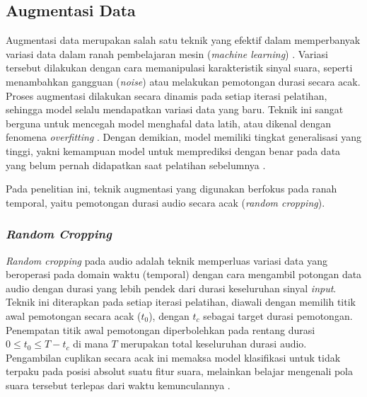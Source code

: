 \subsection{Augmentasi Data} \label{II.Teori6}
Augmentasi data merupakan salah satu teknik yang efektif dalam memperbanyak variasi data dalam ranah pembelajaran mesin (\textit{machine learning}) \cite{goodfellow2016deep}.
Variasi tersebut dilakukan dengan cara memanipulasi karakteristik sinyal suara, seperti menambahkan gangguan (\textit{noise}) atau melakukan pemotongan durasi secara acak.
Proses augmentasi dilakukan secara dinamis pada setiap iterasi pelatihan, sehingga model selalu mendapatkan variasi data yang baru.
Teknik ini sangat berguna untuk mencegah model menghafal data latih, atau dikenal dengan fenomena \textit{overfitting} \cite{salamon2017deep}.
Dengan demikian, model memiliki tingkat generalisasi yang tinggi, yakni kemampuan model untuk memprediksi dengan benar pada data yang belum pernah didapatkan saat pelatihan sebelumnya \cite{goodfellow2016deep}. \par

Pada penelitian ini, teknik augmentasi yang digunakan berfokus pada ranah temporal, yaitu pemotongan durasi audio secara acak (\textit{random cropping}). \par

\subsubsection{\textit{Random Cropping}} \label{II.Teori6.1}
\textit{Random cropping} pada audio adalah teknik memperluas variasi data yang beroperasi pada domain waktu (temporal) dengan cara mengambil potongan data audio dengan durasi yang lebih pendek dari durasi keseluruhan sinyal \textit{input}.
Teknik ini diterapkan pada setiap iterasi pelatihan, diawali dengan memilih titik awal pemotongan secara acak ($t_0$), dengan $t_c$ sebagai target durasi pemotongan. 
Penempatan titik awal pemotongan diperbolehkan pada rentang durasi $0 \le t_0 \le T-{t_c}$ di mana $T$ merupakan total keseluruhan durasi audio.
Pengambilan cuplikan secara acak ini memaksa model klasifikasi untuk tidak terpaku pada posisi absolut suatu fitur suara, melainkan belajar mengenali pola suara tersebut terlepas dari waktu kemunculannya \cite{salamon2017deep}. \par

